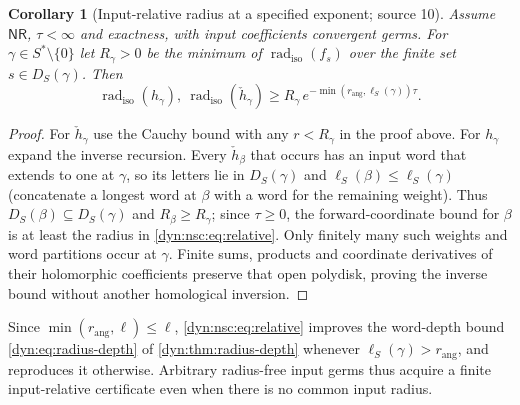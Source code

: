 \documentclass[11pt,letterpaper]{article}
\newtheorem{corollary}[corollary]{Corollary}
\theoremstyle{definition}
\theoremstyle{remark}
\newcommand{\radiso}{\operatorname{rad}_{\mathrm{iso}}}
\newcommand{\nres}{\mathsf{NR}}
\newcommand{\rang}{r_{\mathrm{ang}}}
\numberwithin{equation}{section}
\begin{document}
\begin{corollary}[Input-relative radius at a specified exponent; source 10]
\label{dyn:nsc:cor:local}
Assume $\nres$, $\tau<\infty$ and exactness, with input coefficients
convergent germs. For $\gamma\in S^{*}\setminus\{0\}$ let $R_\gamma>0$ be
the minimum of $\radiso(f_s)$ over the finite set $s\in D_S(\gamma)$. Then
\begin{equation}\label{dyn:nsc:eq:relative}
 \radiso(h_\gamma),\ \radiso(\check h_\gamma)
 \ge R_\gamma\,e^{-\min(\rang,\ell_S(\gamma))\tau}.
\end{equation}
\end{corollary}
\begin{proof}
For $\check h_\gamma$ use the Cauchy bound with any $r<R_\gamma$ in the proof
above. For $h_\gamma$ expand the inverse recursion. Every $\check h_\beta$
that occurs has an input word that extends to one at $\gamma$, so its
letters lie in $D_S(\gamma)$ and $\ell_S(\beta)\le\ell_S(\gamma)$
(concatenate a longest word at $\beta$ with a word for the remaining
weight). Thus $D_S(\beta)\subseteq D_S(\gamma)$ and
$R_\beta\ge R_\gamma$; since $\tau\ge0$, the forward-coordinate bound
for $\beta$ is at least the radius in \eqref{dyn:nsc:eq:relative}.
Only finitely many such weights and word partitions occur at $\gamma$.
Finite sums, products and coordinate derivatives of their holomorphic
coefficients preserve that open polydisk, proving the inverse bound without
another homological inversion.
\end{proof}

Since $\min(\rang,\ell)\le\ell$, \eqref{dyn:nsc:eq:relative} improves the
word-depth bound \eqref{dyn:eq:radius-depth} of \cref{dyn:thm:radius-depth}
whenever $\ell_S(\gamma)>\rang$, and reproduces it otherwise. Arbitrary
radius-free input germs thus acquire a finite input-relative certificate
even when there is no common input radius.
\end{document}
